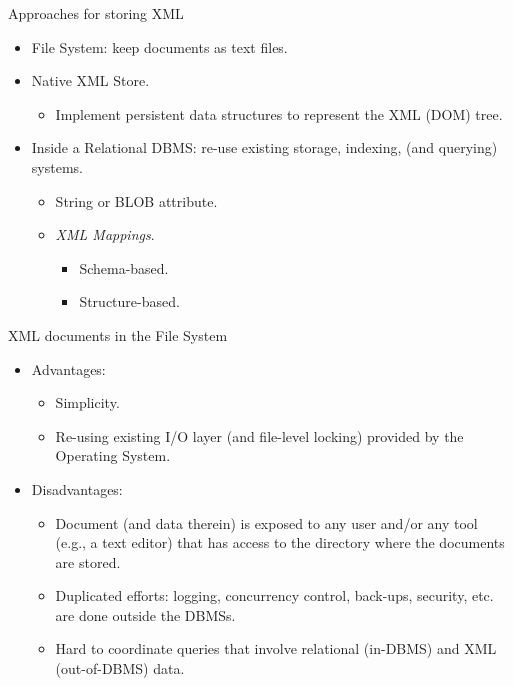
\begin{frame}{Approaches for storing XML}

\begin{itemize}[-]
\item File System: keep documents as text files.
\item Native XML Store.
\begin{itemize}[-]
\item Implement persistent data structures to represent the XML (DOM) tree.
\end{itemize}
\item Inside a Relational DBMS: re-use existing storage, indexing, (and querying) systems.
\begin{itemize}[-]
\item String or BLOB attribute.
\item \emph{XML Mappings}.
\begin{itemize}[$\star$]
\item Schema-based.
\item Structure-based.
\end{itemize}
\end{itemize}
\end{itemize}
\end{frame}


\begin{frame}{XML documents in the File System}

\begin{itemize}[-]
\item Advantages:
\begin{itemize}[-]
\item Simplicity. 
\item Re-using existing I/O layer (and file-level locking) provided by the Operating System.
\end{itemize}

\item Disadvantages:
\begin{itemize}[-]
\item Document (and data therein) is exposed to \alert{any user} and/or \alert{any tool} (e.g., a text editor) that has access to the directory where the documents are stored.
\item Duplicated efforts: logging, concurrency control, back-ups, security, etc. are done outside the DBMSs.
\item Hard to coordinate queries that involve relational (in-DBMS) and XML (out-of-DBMS) data.
\end{itemize}
\end{itemize}
\end{frame}

